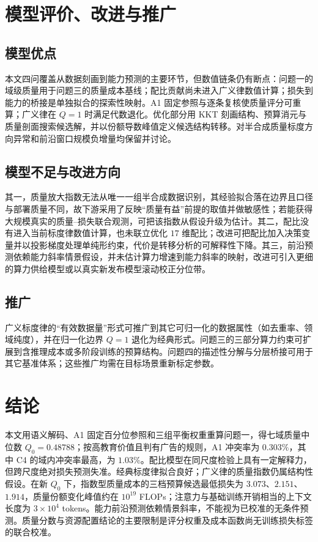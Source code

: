 \section{模型评价、改进与推广}

\subsection{模型优点}
本文四问覆盖从数据刻画到能力预测的主要环节，但数值链条仍有断点：问题一的域级质量用于问题三的质量成本基线；配比贡献尚未进入广义律数值计算；损失到能力的桥接是单独拟合的探索性映射。A1 固定参照与逐条复核使质量评分可重算；广义律在 $Q=1$ 时满足代数退化。优化部分用 KKT 刻画结构、预算消元与质量剖面搜索候选解，并以份额导数峰值定义候选结构转移。对半合成质量标度方向异常和前沿窗口规模负增量均保留并讨论。

\subsection{模型不足与改进方向}
其一，质量放大指数无法从唯一一组半合成数据识别，其经验拟合落在边界且口径与部署质量不同，故下游采用了反映“质量有益”前提的取值并做敏感性；若能获得大规模真实的质量--损失联合观测，可把该指数从假设升级为估计。其二，配比没有进入当前标度律数值计算，也未联立优化 $17$ 维配比；改进可把配比加入决策变量并以投影梯度处理单纯形约束，代价是转移分析的可解释性下降。其三，前沿预测依赖能力斜率情景假设，并未估计算力增速到能力斜率的映射，改进可引入更细的算力供给模型或以真实新发布模型滚动校正分位带。

\subsection{推广}
广义标度律的“有效数据量”形式可推广到其它可归一化的数据属性（如去重率、领域纯度），并在归一化边界 $Q=1$ 退化为经典形式。问题三的三部分算力约束可扩展到含推理成本或多阶段训练的预算结构。问题四的描述性分解与分层桥接可用于其它基准体系；这些推广均需在目标场景重新标定参数。

\section{结论}
本文用语义解码、A1 固定百分位参照和三组平衡权重重算问题一，得七域质量中位数 $Q_0=0.48788$；按高教育价值且判有广告的规则，A1 冲突率为 $0.303\%$，其中 C4 的域内冲突率最高，为 $1.03\%$。配比模型在同尺度检验上具有一定解释力，但跨尺度绝对损失预测失准。经典标度律拟合良好；广义律的质量指数仍属结构性假设。在新 $Q_0$ 下，指数型质量成本的三档预算候选最低损失为 $3.073$、$2.151$、$1.914$，质量份额变化峰值约在 $10^{19}$ FLOPs；注意力与基础训练开销相当的上下文长度为 $3\times10^{4}$ tokens。能力前沿预测依赖情景斜率，不能视为已校准的无条件预测。质量分数与资源配置结论的主要限制是评分权重及成本函数尚无训练损失标签的联合校准。
